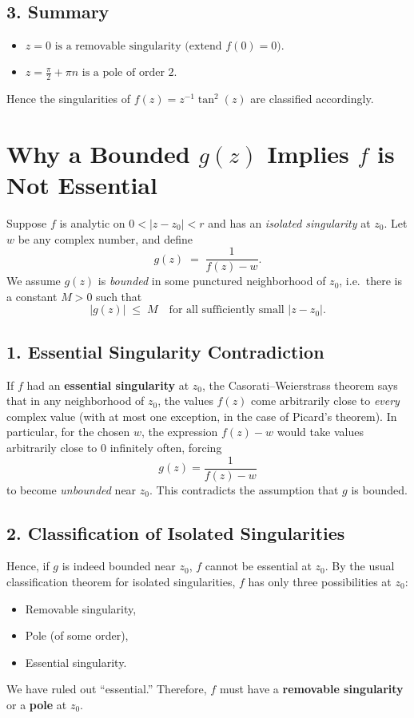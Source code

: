 \documentclass[12pt]{article}
\theoremstyle{definition} %
\theoremstyle{plain} %
\begin{document}
\subsection*{3. Summary}

\begin{itemize}
  \item \(\boxed{z=0 \text{ is a removable singularity (extend }f(0)=0\text{).}}\)
  \item \(\boxed{z = \tfrac{\pi}{2} + \pi n \text{ is a pole of order 2.}}\)
\end{itemize}

Hence the singularities of \(f(z) = z^{-1}\tan^2(z)\) are classified accordingly.

\section*{Why a Bounded \(g(z)\) Implies \(f\) is Not Essential}

Suppose $f$ is analytic on $0<|z-z_0|<r$ and has an \emph{isolated singularity} at $z_0$.  Let $w$ be any complex number, and define
\[
g(z) \;=\; \frac{1}{f(z) - w}.
\]
We assume $g(z)$ is \emph{bounded} in some punctured neighborhood of $z_0$, i.e.\ there is a constant $M>0$ such that
\[
|g(z)| \;\le\; M
\quad\text{for all sufficiently small }|z-z_0|.
\]

\subsection*{1. Essential Singularity Contradiction}

If $f$ had an \textbf{essential singularity} at $z_0$, the Casorati--Weierstrass theorem says that in any neighborhood of $z_0$, the values $f(z)$ come arbitrarily close to \emph{every} complex value (with at most one exception, in the case of Picard's theorem).  In particular, for the chosen $w$, the expression $f(z)-w$ would take values arbitrarily close to $0$ infinitely often, forcing
\[
g(z) = \frac{1}{f(z) - w}
\]
to become \emph{unbounded} near $z_0$.  This contradicts the assumption that $g$ is bounded.

\subsection*{2. Classification of Isolated Singularities}

Hence, if $g$ is indeed bounded near $z_0$, $f$ cannot be essential at $z_0$.  By the usual classification theorem for isolated singularities, $f$ has only three possibilities at $z_0$:
\begin{itemize}
  \item Removable singularity,
  \item Pole (of some order),
  \item Essential singularity.
\end{itemize}
We have ruled out “essential.”  Therefore, $f$ must have a \textbf{removable singularity} or a \textbf{pole} at $z_0$.
\end{document}
